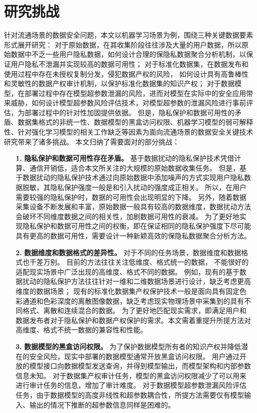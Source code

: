 \section{研究挑战}
针对流通场景的数据安全问题，本文以机器学习场景为例，围绕三种关键数据要素形式展开研究：
对于原始数据，在其收集阶段往往涉及大量的用户数据，所以原始数据中不乏一些用户隐私数据，如何设计合理的保隐私数据聚合分析机制，以保证用户隐私不泄漏并实现较高的数据可用性；
对于标准化数据集，在数据发布和使用过程中存在未授权复制分发，侵犯数据产权的风险，
如何设计具有高鲁棒性和灵敏性的数据产权审计机制，以保护标准化数据集的知识产权；
对于数据模型，在部署过程中存在模型超参数泄漏的风险，进而对模型在实际中的安全应用带来威胁，如何设计模型超参数风险评估技术，对模型超参数的泄漏风险进行事前评估，为部署过程中的针对性加固提供依据。
但是，隐私保护和数据可用性的矛盾、数据集格式的非统一性、数据模型的黑盒访问权限、机器学习模型的弱可解释性、针对强化学习模型的相关工作缺乏等因素为面向流通场景的数据安全关键技术研究带来了诸多挑战。
本文归纳了需要面对的部分挑战：
\begin{itemize}
    \item[\textbf{1.}]\textbf{隐私保护和数据可用性存在矛盾。}
    基于数据扰动的隐私保护技术凭借计算、通信开销低，适合本文所关注的大规模的原始数据收集任务。
    但是，基于数据扰动的隐私保护技术通过向原始数据中添加噪声的方式实现用户隐私数据脱敏，其隐私保护强度一般是和引入扰动的强度成正相关。
    所以，在用户需要较强的隐私保护时，数据的可用性会出现明显的下降。
    另外，随着数据采集设备不断发展和丰富，原始数据一般具有较高的数据维度，数据扰动方法会破坏不同维度数据之间的相关性，加剧数据可用性的衰减。
    为了更好地实现隐私保护和数据可用性之间的权衡，即在保证相同的隐私保护强度下尽可能具有更高的数据可用性，需要设计一种新颖高效的保隐私数据聚合分析方法。
    \item[\textbf{2.}]\textbf{数据维度和数据格式的差异性。} 
    对于不同的任务场景，数据维度和数据格式也千差万别。
    目前的方法往往关注低维度、格式统一的数据，
    不能很好的适配现实场景中广泛出现的高维度、格式不同的数据。
    例如，现有的基于数据扰动的隐私保护方法往往针对一维和二维数据场景进行设计，缺乏考虑更高维度的数据场景；
    现有的标准化数据集产权保护技术一般是面向具有固定色彩通道和色彩深度的离散图像数据，缺乏考虑现实物理场景中采集到的具有不同格式、离散和连续混合的数据。
    为了更好地匹配现实需求，即满足用户和数据发布者对于隐私保护和数据产权保护的需求。本文需着重提升所提方法对高维度、格式不统一数据的兼容性和性能。
    \item[\textbf{3.}]\textbf{数据模型的黑盒访问权限。} 为了保护数据模型所有者的知识产权并降低潜在的安全风险，现实中部署的数据模型通常开放黑盒访问权限。
    用户通过开放的模型接口向数据模型发送查询，并得到模型输出，而模型架构和内部参数信息未知。
    对于数据集产权审计任务，模型的黑盒访问权限减少了可以用来进行审计任务的信息，增加了审计难度。
    对于数据模型超参数泄漏风险评估任务，由于数据模型的高度非线性和超参数耦合性，所提方法需要仅有模型输入、输出的情况下推断的超参数信息同样是困难的。
\end{itemize}
